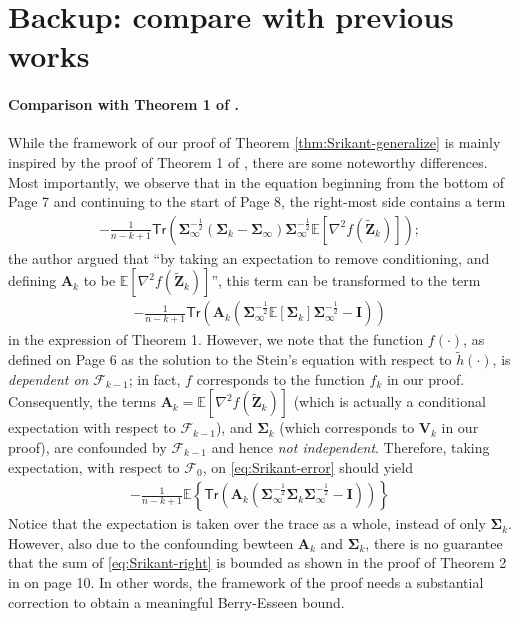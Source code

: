 \section{Backup: compare with previous works}

\paragraph{Comparison with Theorem 1 of \cite{srikant2024rates}.} While the framework of our proof of Theorem \ref{thm:Srikant-generalize} is mainly inspired by the proof of Theorem 1 of \cite{srikant2024rates}, there are some noteworthy differences. Most importantly, we observe that in the equation beginning from the bottom of Page 7 and continuing to the start of Page 8, the right-most side contains a term
\begin{align}\label{eq:Srikant-error}
-\frac{1}{n-k+1} \mathsf{Tr}\left(\bm{\Sigma}_{\infty}^{-\frac{1}{2}}(\bm{\Sigma}_k - \bm{\Sigma}_{\infty})\bm{\Sigma}_{\infty}^{-\frac{1}{2}}\mathbb{E}[\nabla^2 f(\tilde{\bm{Z}}_k)]\right);
\end{align}
the author argued that ``by taking an expectation to remove conditioning, and defining $\bm{A}_k$ to be $\mathbb{E}[\nabla^2 f(\tilde{\bm{Z}}_k)]$'', this term can be transformed to the term
\begin{align}\label{eq:Srikant-wrong}
-\frac{1}{n-k+1} \mathsf{Tr}\left(\bm{A}_k \left(\bm{\Sigma}_{\infty}^{-\frac{1}{2}} \mathbb{E}[\bm{\Sigma}_k]\bm{\Sigma}_{\infty}^{-\frac{1}{2}}-\bm{I}\right)\right)
\end{align}
in the expression of Theorem 1. However, we note that the function $f(\cdot)$, as defined on Page 6 as the solution to the Stein's equation with respect to $\tilde{h}(\cdot)$, is \emph{dependent on} $\mathcal{F}_{k-1}$; in fact, $f$ corresponds to the function $f_k$ in our proof. Consequently, the terms $\bm{A}_k = \mathbb{E}[\nabla^2 f(\tilde{\bm{Z}}_k)]$ (which is actually a conditional expectation with respect to $\mathcal{F}_{k-1}$), and $\bm{\Sigma}_k$ (which corresponds to $\bm{V}_k$ in our proof), are confounded by $\mathcal{F}_{k-1}$ and hence \emph{not independent}. Therefore, taking expectation, with respect to $\mathcal{F}_0$, on \eqref{eq:Srikant-error} should yield
\begin{align}\label{eq:Srikant-right}
-\frac{1}{n-k+1} \mathbb{E}\left\{\mathsf{Tr}\left(\bm{A}_k \left(\bm{\Sigma}_{\infty}^{-\frac{1}{2}} \bm{\Sigma}_k\bm{\Sigma}_{\infty}^{-\frac{1}{2}}-\bm{I}\right)\right)\right\}
\end{align}
Notice that the expectation is taken over the trace as a whole, instead of only $\bm{\Sigma}_k$. However, also due to the confounding bewteen $\bm{A}_k$ and $\bm{\Sigma}_k$, there is no guarantee that the sum of \eqref{eq:Srikant-right} is bounded as shown in the proof of Theorem 2 in \cite{srikant2024rates} on page 10. In other words, the framework of the proof needs a substantial correction to obtain a meaningful Berry-Esseen bound. 

